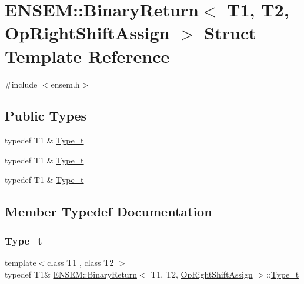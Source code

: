 \hypertarget{structENSEM_1_1BinaryReturn_3_01T1_00_01T2_00_01OpRightShiftAssign_01_4}{}\section{E\+N\+S\+EM\+:\+:Binary\+Return$<$ T1, T2, Op\+Right\+Shift\+Assign $>$ Struct Template Reference}
\label{structENSEM_1_1BinaryReturn_3_01T1_00_01T2_00_01OpRightShiftAssign_01_4}


{\ttfamily \#include $<$ensem.\+h$>$}

\subsection*{Public Types}
\begin{DoxyCompactItemize}
\item 
typedef T1 \& \mbox{\hyperlink{structENSEM_1_1BinaryReturn_3_01T1_00_01T2_00_01OpRightShiftAssign_01_4_a26258e35d38645434ce665a2ece52c32}{Type\+\_\+t}}
\item 
typedef T1 \& \mbox{\hyperlink{structENSEM_1_1BinaryReturn_3_01T1_00_01T2_00_01OpRightShiftAssign_01_4_a26258e35d38645434ce665a2ece52c32}{Type\+\_\+t}}
\item 
typedef T1 \& \mbox{\hyperlink{structENSEM_1_1BinaryReturn_3_01T1_00_01T2_00_01OpRightShiftAssign_01_4_a26258e35d38645434ce665a2ece52c32}{Type\+\_\+t}}
\end{DoxyCompactItemize}


\subsection{Member Typedef Documentation}
\mbox{\label{structENSEM_1_1BinaryReturn_3_01T1_00_01T2_00_01OpRightShiftAssign_01_4_a26258e35d38645434ce665a2ece52c32}} 
\subsubsection{\texorpdfstring{Type\_t}{Type\_t}\hspace{0.1cm}{\footnotesize\ttfamily [1/3]}}
{\footnotesize\ttfamily template$<$class T1 , class T2 $>$ \\
typedef T1\& \mbox{\hyperlink{structENSEM_1_1BinaryReturn}{E\+N\+S\+E\+M\+::\+Binary\+Return}}$<$ T1, T2, \mbox{\hyperlink{structENSEM_1_1OpRightShiftAssign}{Op\+Right\+Shift\+Assign}} $>$\+::\mbox{\hyperlink{structENSEM_1_1BinaryReturn_3_01T1_00_01T2_00_01OpRightShiftAssign_01_4_a26258e35d38645434ce665a2ece52c32}{Type\+\_\+t}}}

